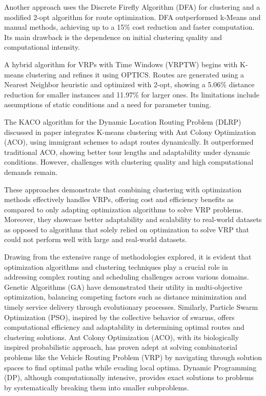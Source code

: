 Another approach \cite{firefly} uses the Discrete Firefly Algorithm (DFA) for clustering and a modified 2-opt algorithm for route optimization. DFA outperformed k-Means and manual methods, achieving up to a 15\% cost reduction and faster computation. Its main drawback is the dependence on initial clustering quality and computational intensity.

A hybrid algorithm \cite{hybrid_kmeans} for VRPs with Time Windows (VRPTW) begins with K-means clustering and refines it using OPTICS. Routes are generated using a Nearest Neighbor heuristic and optimized with 2-opt, showing a 5.06\% distance reduction for smaller instances and 11.97\% for larger ones. Its limitations include assumptions of static conditions and a need for parameter tuning.

The KACO algorithm for the Dynamic Location Routing Problem (DLRP) discussed in paper \cite{aco_dp_cluster} integrates K-means clustering with Ant Colony Optimization (ACO), using immigrant schemes to adapt routes dynamically. It outperformed traditional ACO, showing better tour lengths and adaptability under dynamic conditions. However, challenges with clustering quality and high computational demands remain.

These approaches demonstrate that combining clustering with optimization methods effectively handles VRPs, offering cost and efficiency benefits as compared to only adapting optimization algorithms to solve VRP problems. Moreover, they showcase better adaptability and scalability to real-world datasets as opposed to algorithms that solely relied on optimization to solve VRP that could not perform well with large and real-world datasets.


Drawing from the extensive range of methodologies explored, it is evident that optimization algorithms and clustering techniques play a crucial role in addressing complex routing and scheduling challenges across various domains. Genetic Algorithms (GA) have demonstrated their utility in multi-objective optimization, balancing competing factors such as distance minimization and timely service delivery through evolutionary processes. Similarly, Particle Swarm Optimization (PSO), inspired by the collective behavior of swarms, offers computational efficiency and adaptability in determining optimal routes and clustering solutions. Ant Colony Optimization (ACO), with its biologically inspired probabilistic approach, has proven adept at solving combinatorial problems like the Vehicle Routing Problem (VRP) by navigating through solution spaces to find optimal paths while evading local optima. Dynamic Programming (DP), although computationally intensive, provides exact solutions to problems by systematically breaking them into smaller subproblems.

